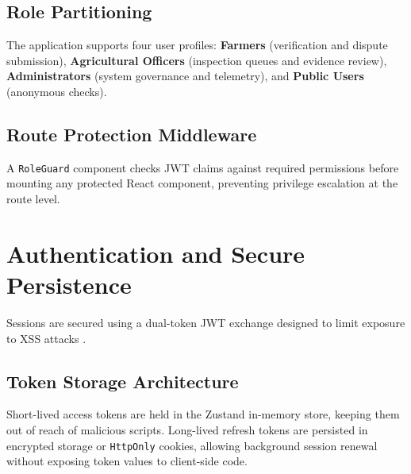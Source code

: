 \subsection{Role Partitioning}
The application supports four user profiles: \textbf{Farmers} (verification and dispute submission), \textbf{Agricultural Officers} (inspection queues and evidence review), \textbf{Administrators} (system governance and telemetry), and \textbf{Public Users} (anonymous checks).

\subsection{Route Protection Middleware}
A \texttt{RoleGuard} component checks JWT claims against required permissions before mounting any protected React component, preventing privilege escalation at the route level.




\section{Authentication and Secure Persistence}
\label{sec:authentication}

Sessions are secured using a dual-token JWT exchange designed to limit exposure to XSS attacks \cite{masue2024quantifying}.

\subsection{Token Storage Architecture}
Short-lived access tokens are held in the Zustand in-memory store, keeping them out of reach of malicious scripts. Long-lived refresh tokens are persisted in encrypted storage or \texttt{HttpOnly} cookies, allowing background session renewal without exposing token values to client-side code.

